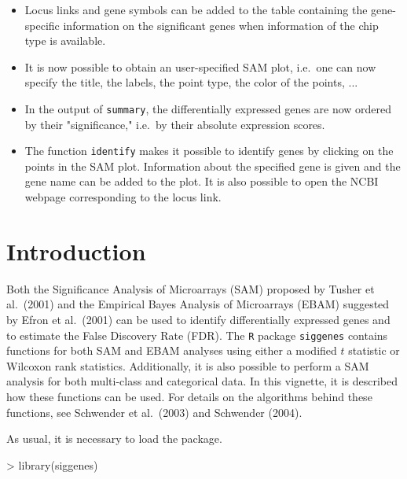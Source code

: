 \documentclass[a4paper]{article}
\begin{document}
\begin{itemize}
\item Locus links and gene symbols can be added to the table containing the gene-specific
information on the significant genes when information of the chip type is available.

\item It is now possible to obtain an user-specified SAM plot, i.e.\ one can now specify the
title, the labels, the point type, the color of the points, ...

\item In the output of \texttt{summary}, the differentially expressed genes are now
ordered by their "significance," i.e.\ by their absolute expression scores.

\item The function \texttt{identify} makes it possible to identify genes by clicking on the points
in the SAM plot. Information about the specified gene is given and the gene name can be
added to the plot. It is also possible to open the NCBI webpage corresponding to the locus link.
\end{itemize}

\newpage





\section{Introduction}

Both the Significance Analysis of Microarrays (SAM) proposed by
Tusher et al.\ (2001) and the Empirical Bayes Analysis of
Microarrays (EBAM) suggested by Efron et al.\ (2001) can be used
to identify differentially expressed genes and to estimate the
False Discovery Rate (FDR). The \texttt{R} package
\texttt{siggenes} contains functions for both SAM and EBAM
analyses using either a modified $t$ statistic or Wilcoxon rank
statistics. Additionally, it is also possible to perform a SAM analysis
for both multi-class and categorical data. In this vignette, it is described how these
functions can be used. For details on the algorithms
behind these functions, see Schwender et al.\ (2003) and Schwender (2004).

As usual, it is necessary to load the package.


\begin{Schunk}
\begin{Sinput}
> library(siggenes)
\end{Sinput}
\end{Schunk}
\end{document}
